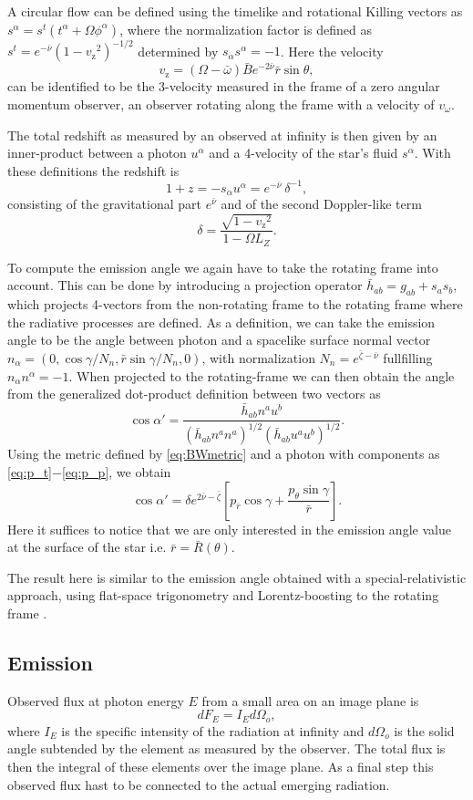 \documentclass[iop, usenatbib]{emulateapj}
\newcommand{\be}{\begin{equation}}
\newcommand{\ee}{\end{equation}}
\newcommand{\rb}{\ensuremath{\bar{r}}}
\newcommand{\wb}{\ensuremath{\bar{\omega}}}
\newcommand{\nub}{\ensuremath{\bar{\nu}}}
\newcommand{\zetab}{\ensuremath{\bar{\zeta}}}
\newcommand{\Bb}{\ensuremath{\bar{B}}}
\newcommand{\vw}{\ensuremath{v_{\omega}}}
\newcommand{\vz}{\ensuremath{v_{\mathrm{z}}}}
\begin{document}
A circular flow can be defined using the timelike and rotational Killing vectors as $s^{\alpha} = s^t (t^{\alpha} + \Omega \phi^{\alpha})$, where the normalization factor is defined as $s^t = e^{-\nub} (1 - \vz^2)^{-1/2}$ determined by $s_{\alpha}s^{\alpha} = -1$.
Here the velocity 
\be
\vz = (\Omega - \wb) \Bb e^{-2\nub} \rb \sin\theta,
\ee
can be identified to be the 3-velocity measured in the frame of a zero angular momentum observer, an observer rotating along the frame with a velocity of $\vw$.

The total redshift as measured by an observed at infinity is then given by an inner-product between a photon $u^{\alpha}$ and a 4-velocity of the star's fluid $s^{\alpha}$.
With these definitions the redshift is
\be
1 + z = -s_{\alpha} u^{\alpha} = e^{-\nub} ~\delta^{-1},
\ee
consisting of the gravitational part $e^{\nub}$ and of the second Doppler-like term
\be
\delta = \frac{\sqrt{1-\vz^2}}{1 - \Omega L_Z}.
\ee

To compute the emission angle we again have to take the rotating frame into account.  
This can be done by introducing a projection operator $\bar{h}_{ab} = g_{ab} + s_a s_b$, which projects 4-vectors from the non-rotating frame to the rotating frame where the radiative processes are defined.  
As a definition, we can take the emission angle to be the angle between photon and a spacelike surface normal vector $n_{\alpha} = (0, \cos\gamma/N_n, \rb \sin\gamma/N_n, 0)$, with normalization $N_n = e^{\zetab - \nub}$ fullfilling $n_{\alpha}n^{\alpha} = -1$.  
When projected to the rotating-frame we can then obtain the angle from the generalized dot-product definition between two vectors as
\be\label{eq:gen_angle}
\cos\alpha' = \frac{\bar{h}_{ab}n^a u^b}{(\bar{h}_{ab} n^a n^a)^{1/2} (\bar{h}_{ab} u^a u^b)^{1/2}}.
\ee
Using the metric defined by \eqref{eq:BWmetric} and a photon with components as \eqref{eq:p_t}$-$\eqref{eq:p_p}, we obtain
\be
\cos\alpha' = \delta e^{2\nub-\zetab} \left[ p_{\rb} \cos\gamma + \frac{p_{\theta} \sin\gamma}{\rb} \right].
\ee
Here it suffices to notice that we are only interested in the emission angle value at the surface of the star i.e. $\rb = \bar{R}(\theta)$.

The result here is similar to the emission angle obtained with a special-relativistic approach, using flat-space trigonometry and Lorentz-boosting to the rotating frame \citep[see e.g.][]{PB06}.


\subsection{Emission}\label{sect:emission}
Observed flux at photon energy $E$ from a small area on an image plane is
\be
dF_E = I_E d\Omega_o,
\ee
where $I_E$ is the specific intensity of the radiation at infinity and $d\Omega_o$ is the solid angle subtended by the element as measured by the observer. 
The total flux is then the integral of these elements over the image plane. 
As a final step this observed flux hast to be connected to the actual emerging radiation.
\end{document}

